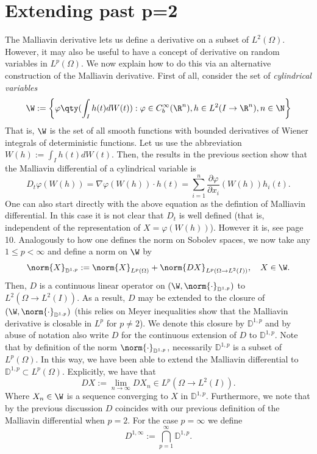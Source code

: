 \documentclass[
    a4paper,
    DIV=14,
    abstract=true,
    numbers=noenddot
]{scrartcl}
\begin{document}
\section{Extending past p=2}
The Malliavin derivative lets us define a derivative on a subset of $L^2(\Omega)$. However, it may also be useful to have a concept of derivative
on random variables in $L^p(\Omega)$. We now explain how to do this via an alternative construction of the Malliavin derivative. First of all, consider the set of \emph{cylindrical variables}
\begin{equation*}
	\W:=\left\{\varphi\qty(\int_{I}h(t) dW(t)):\varphi\in C_b^\infty(\R^n), h\in L^2(I\to\R^n), n \in \N \right\}
\end{equation*}
That is, $\W$ is the set of all smooth functions with bounded derivatives of Wiener integrals of deterministic functions. Let us use the abbreviation  $W(h):=\int_{I}h(t) dW(t)$.
Then, the results in the previous section show that the Malliavin differential of a cylindrical variable is
\begin{equation*}
	D_t\varphi(W(h))=\nabla\varphi(W(h))\cdot h(t)=\sum_{i=1}^{n} \frac{\partial \varphi}{\partial x_i}(W(h))h_i(t).
\end{equation*}
One can also start directly with the above equation as the defintion of Malliavin differential.
In this case it is not clear that $D_t$ is well defined (that is, independent of the representation of  $X=\varphi(W(h))$). However it is, see \cite{hairer2021introduction} page 10.
Analogously to how one defines the norm on Sobolev spaces, we now take any $1\leq p< \infty $ and define a norm on $\W$ by
\begin{equation*}
	\norm{X}_{\mathbb{D}^{1,p}}:=\norm{X}_{L^p(\Omega)}+\norm{DX}_{L^p(\Omega\to L^2(I))},\quad X\in \W.
\end{equation*}
Then, $D$ is a continuous linear operator on $(\W,\norm{\cdot }_{\mathbb{D}^{1,p}})$ to $L^2(\Omega\to L^2(I))$. As a result, $D$ may be extended to the closure of $(\W,\norm{\cdot }_{\mathbb{D}^{1,p}})$ (this relies on Meyer inequalities  show that the Malliavin derivative is closable in $L^p$ for $p \neq  2$). We denote this closure by $\mathbb{D}^{1,p}$ and by abuse of notation also write $D$ for the continuous extension of  $D$ to $\mathbb{D}^{1,p}$. Note that by definition of the norm $\norm{\cdot }_{\mathbb{D}^{1,p}}$, necessarily $\mathbb{D}^{1,p}$ is a subset of $L^p(\Omega)$. In this way, we have been
able to extend the Malliavin differential to $\mathbb{D}^{1,p}\subset L^p(\Omega)$. Explicitly, we have that
\begin{equation*}
	D X:=\lim_{n \to \infty}D X_n \in L^p(\Omega\to L^2(I)).
\end{equation*}
Where $X_n \in \W$ is a sequence converging to  $X$ in  $\mathbb{D}^{1,p}$. Furthermore, we note that by the previous discussion $D$ coincides with our previous definition
of the Malliavin differential when $p=2$. For the case $p=\infty$ we define
\begin{equation*}
	D^{1,\infty}:=\bigcap_{p=1} ^\infty \mathbb{D}^{1,p}.
\end{equation*}
\end{document}
